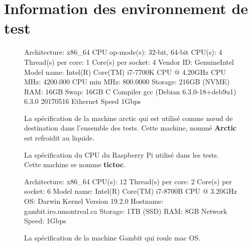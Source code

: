 \chapter{Information des environnement de test}
\label{ch:annexeA}

\begin{figure}[ht]
  \centering
\begin{mplisting}{1}
Architecture:          x86_64
CPU op-mode(s):        32-bit, 64-bit
CPU(s):                4
Thread(s) per core:    1
Core(s) per socket:    4
Vendor ID:             GenuineIntel
Model name:            Intel(R) Core(TM) i7-7700K CPU @ 4.20GHz
CPU MHz:               4200.000
CPU min MHz:           800.0000
Storage:               216GB (NVME)
RAM:                   16GB
Swap:                  16GB
C Compiler             gcc (Debian 6.3.0-18+deb9u1) 6.3.0 20170516
Ethernet Speed         1Gbps
\end{mplisting}
  \caption{La spécification de la machine arctic qui est utilisé comme nœud de destination dans
  l'ensemble des tests. Cette machine, nommé \textbf{Arctic} est refroidit au liquide.}
\end{figure}

\begin{figure}[ht]
  \caption{La spécification du CPU du Raspberry Pi utilisé dans les tests.
  Cette machine se nomme \textbf{tictoc}.}
\end{figure}

\begin{figure}[ht]
  \begin{mplisting}{1}
Architecture:        x86_64
CPU(s):              12
Thread(s) per core:  2
Core(s) per socket:  6
Model name:          Intel(R) Core(TM) i7-8700B CPU @ 3.20GHz
OS:                  Darwin Kernel Version 19.2.0
Hostname:            gambit.iro.umontreal.ca
Storage:             1TB (SSD)
RAM:                 8GB
Network Speed:       1Gbps
\end{mplisting}
  \caption{La spécification de la machine Gambit qui roule mac OS.}
\end{figure}
